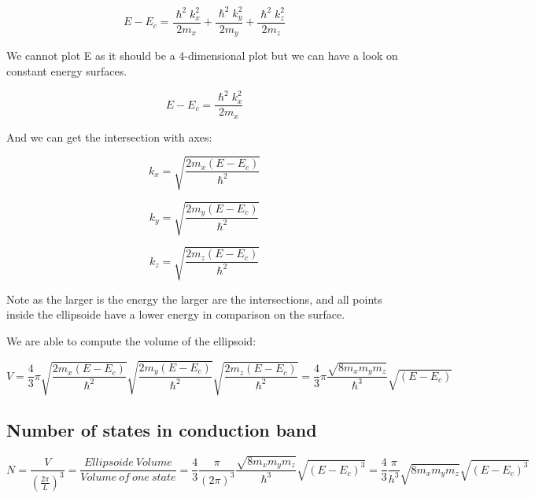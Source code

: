			\begin{equation}
				E-E_c=\frac{\hslash^2k_x^2}{2m_x}+\frac{\hslash^2k_y^2}{2m_y}+\frac{\hslash^2k_z^2}{2m_z}
			\end{equation}

			We cannot plot E as it should be a 4-dimensional plot but we can have a look on constant energy surfaces.

			\begin{equation}
				E-E_c=\frac{\hslash^2k_x^2}{2m_x}
			\end{equation}

			And we can get the intersection with axes:

			\begin{equation}
				k_x=\sqrt {\frac { 2m_x(E-E_c)} {\hslash^2} }	
			\end{equation}

			\begin{equation}
				k_y=\sqrt{\frac{2m_y(E-E_c)}{\hslash^2}} 	
			\end{equation}

			\begin{equation}
				k_z=\sqrt{\frac{2m_z(E-E_c)}{\hslash^2}}
			\end{equation}

			Note as the larger is the energy the larger are the intersections, and all points inside the ellipsoide have a lower energy in comparison on the surface.

			We are able to compute the volume of the ellipsoid:

			\begin{equation}
				V=\frac{4}{3}\pi \sqrt{\frac{2m_x(E-E_c)}{\hslash^2}} \sqrt{\frac{2m_y(E-E_c)}{\hslash^2}} \sqrt{\frac{2m_z(E-E_c)}{\hslash^2}}=\frac{4}{3}\pi \frac{\sqrt{8m_x m_y m_z}}{\hslash^3}\sqrt{(E-E_c)}
			\end{equation}

		\subsection{Number of states in conduction band}
			\label{number_of_states_CB}
			\begin{equation}
				N=\frac{V}{(\frac{2\pi}{L})^3}=\frac{Ellipsoide \ Volume}{ Volume \ of \ one \ state }= \frac{4}{3} \frac{\pi}{(2\pi)^3} \frac{\sqrt{8m_x m_y m_z}}{\hslash^3}\sqrt{(E-E_c)^3}= \frac{4}{3} \frac{\pi}{h^3} {\sqrt{8m_x m_y m_z}}\sqrt{(E-E_c)^3}
			\end{equation}

